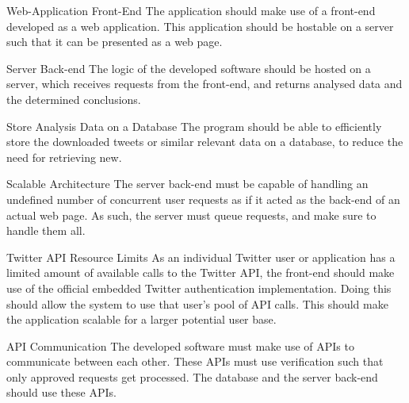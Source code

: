 \begin{requirement}{Web-Application Front-End}
The application should make use of a front-end developed as a web application.
This application should be hostable on a server such that it can be presented as
a web page.
\end{requirement}

\begin{requirement}{Server Back-end}
The logic of the developed software should be hosted on a server, which receives
requests from the front-end, and returns analysed data and the determined
conclusions.
\end{requirement}

\begin{requirement}{Store Analysis Data on a Database}
The program should be able to efficiently store the downloaded tweets or similar
relevant data on a database, to reduce the need for retrieving new.
\end{requirement}

\begin{requirement}{Scalable Architecture}
The server back-end must be capable of handling an undefined number of
concurrent user requests as if it acted as the back-end of an actual web page.
As such, the server must queue requests, and make sure to handle them all.
\end{requirement}

\begin{requirement}{Twitter API Resource Limits}
As an individual Twitter user or application has a limited amount of available
calls to the Twitter API, the front-end should make use of the official embedded
Twitter authentication implementation. Doing this should allow the system to use
that user's pool of API calls. This should make the application scalable for a
larger potential user base.
\end{requirement}

\begin{requirement}{\ac{API} Communication}
The developed software must make use of \ac{API}s to communicate between each
other. These \ac{API}s must use verification such that only approved requests
get processed. The database and the server back-end should use these \ac{API}s.
\end{requirement}




